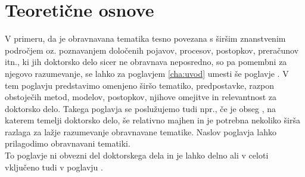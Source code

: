 \chapter{Teoretične osnove}\label{cha:teoreticne_osnove}


V primeru, da je obravnavana tematika tesno povezana s širšim znanstvenim področjem oz. poznavanjem določenih pojavov, procesov, postopkov, preračunov itn., ki jih doktorsko delo sicer ne obravnava neposredno, so pa pomembni za njegovo razumevanje, se lahko za poglavjem \ref{cha:uvod}  umesti še poglavje . V tem poglavju predstavimo omenjeno širšo tematiko, predpostavke, razpon obstoječih metod, modelov, postopkov, njihove omejitve in relevantnost za doktorsko delo. Takega poglavja se poslužujemo tudi npr., če je obseg , na katerem temelji doktorsko delo, še relativno majhen in je potrebna nekoliko širša razlaga za lažje razumevanje obravnavane tematike. Naslov poglavja lahko prilagodimo obravnavani tematiki.\\

To poglavje ni obvezni del doktorskega dela in je lahko delno ali v celoti vključeno tudi v poglavju .

